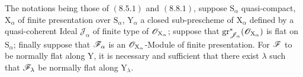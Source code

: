 \begin{proposition}[11.3.6]
\label{IV.11.3.6}
The notations being those of $(8.5.1)$ and $(8.8.1)$, suppose $\mathrm{S}_\alpha$ quasi-compact, $\mathrm{X}_\alpha$ of finite presentation over $\mathrm{S}_\alpha$, $\mathrm{Y}_\alpha$ a closed sub-prescheme of $\mathrm{X}_\alpha$ defined by a quasi-coherent Ideal $\mathscr{J}_\alpha$ of finite type of $\mathscr{O}_{\mathrm{X}_\alpha}$; suppose that $\operatorname{gr}^*_{\mathscr{J}_\alpha}(\mathscr{O}_{\mathrm{X}_\alpha})$ is flat on $\mathrm{S}_\alpha$; finally suppose that $\mathscr{F}_\alpha$ is an $\mathscr{O}_{\mathrm{X}_\alpha}$-Module of finite presentation. For $\mathscr{F}$ to be normally flat along $\mathrm{Y}$, it is necessary and sufficient that there exist $\lambda$ such that $\mathscr{F}_\lambda$ be normally flat along $\mathrm{Y}_\lambda$.
\end{proposition}

